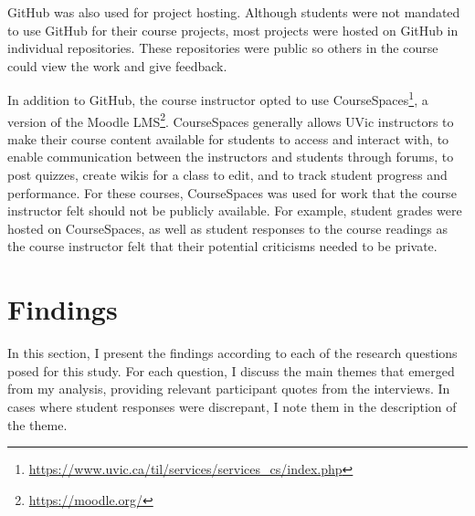 GitHub was also used for project hosting. Although students were not mandated to use GitHub for their course projects, most projects were hosted on GitHub in individual repositories. These repositories were public so others in the course could view the work and give feedback.

In addition to GitHub, the course instructor opted to use CourseSpaces\footnote{\url{https://www.uvic.ca/til/services/services_cs/index.php}}, a version of the Moodle LMS\footnote{\url{https://moodle.org/}}. CourseSpaces generally allows UVic instructors to make their course content available for students to access and interact with, to enable communication between the instructors and students through forums, to post quizzes, create wikis for a class to edit, and to track student progress and performance. For these courses, CourseSpaces was used for work that the course instructor felt should not be publicly available. For example, student grades were hosted on CourseSpaces, as well as student responses to the course readings as the course instructor felt that their potential criticisms needed to be private.

\section{Findings}

In this section, I present the findings according to each of the research questions posed for this study. For each question, I discuss the main themes that emerged from my analysis, providing relevant participant quotes from the interviews. In cases where student responses were discrepant, I note them in the description of the theme.




